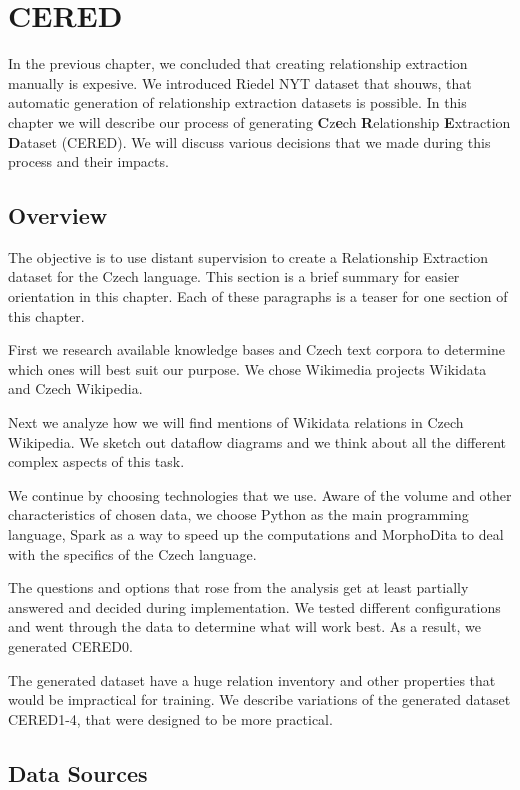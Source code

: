 \chapter{CERED}

In the previous chapter, we concluded that creating relationship extraction manually is expesive. We introduced Riedel NYT dataset that shouws, that automatic generation of relationship extraction datasets is possible. In this chapter we will describe our process of generating \textbf{C}z\textbf{e}ch \textbf{R}elationship \textbf{E}xtraction \textbf{D}ataset (CERED). We will discuss various decisions that we made during this process and their impacts.


\section{Overview}

The objective is to use distant supervision to create a Relationship Extraction dataset for the Czech language. This section is a brief summary for easier orientation in this chapter. Each of these paragraphs is a teaser for one section of this chapter.

First we research available knowledge bases and Czech text corpora to determine which ones will best suit our purpose. We chose Wikimedia projects Wikidata and Czech Wikipedia.

Next we analyze how we will find mentions of Wikidata relations in Czech Wikipedia. We sketch out dataflow diagrams and we think about all the different complex aspects of this task.

We continue by choosing technologies that we use. Aware of the volume and other characteristics of chosen data, we choose Python as the main programming language, Spark as a way to speed up the computations and MorphoDita to deal with the specifics of the Czech language.

The questions and options that rose from the analysis get at least partially answered and decided during implementation. We tested different configurations and went through the data to determine what will work best. As a result, we generated CERED0.

The generated dataset have a huge relation inventory and other properties that would be impractical for training. We describe variations of the generated dataset CERED1-4, that were designed to be more practical.



\section{Data Sources}

